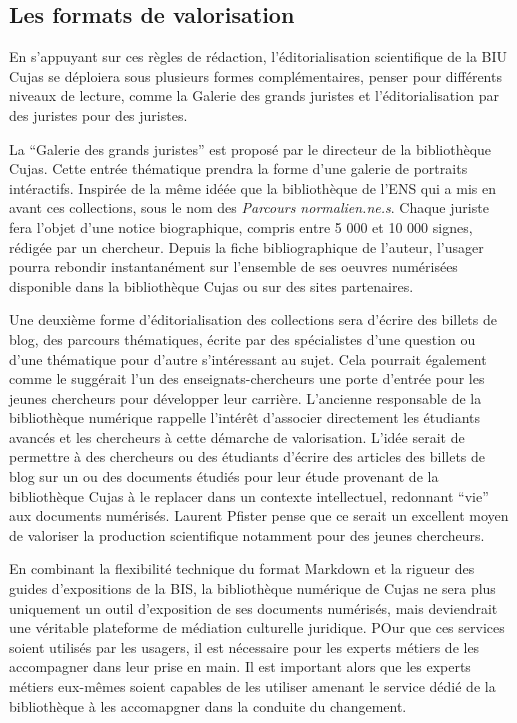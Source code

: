 \subsection{Les formats de valorisation}
En s'appuyant sur ces règles de rédaction, l'éditorialisation scientifique de la BIU Cujas se déploiera sous plusieurs formes complémentaires, penser pour différents niveaux de lecture, comme la Galerie des grands juristes et l'éditorialisation par des juristes pour des juristes.

La \enquote{Galerie des grands juristes} est proposé par le directeur de la bibliothèque Cujas. Cette entrée thématique prendra la forme d'une galerie de portraits intéractifs. Inspirée de la même idéée que la bibliothèque de l'ENS qui a mis en avant ces collections, sous le nom des \textit{Parcours normalien.ne.s}. Chaque juriste fera l'objet d'une notice biographique, compris entre 5 000 et 10 000 signes, rédigée par un chercheur. Depuis la fiche bibliographique de l'auteur, l'usager pourra rebondir instantanément sur l'ensemble de ses oeuvres numérisées disponible dans la bibliothèque Cujas ou sur des sites partenaires.

Une deuxième forme d'éditorialisation des collections sera d'écrire des billets de blog, des parcours thématiques, écrite par des spécialistes d'une question ou d'une thématique pour d'autre s'intéressant au sujet. Cela pourrait également comme le suggérait l'un des enseignats-chercheurs une porte d'entrée pour les jeunes chercheurs pour développer leur carrière. L'ancienne responsable de la bibliothèque numérique rappelle l'intérêt d'associer directement les étudiants avancés et les chercheurs à cette démarche de valorisation. L'idée serait de permettre à des chercheurs ou des étudiants d'écrire des articles des billets de blog sur un ou des documents étudiés pour leur étude provenant de la bibliothèque Cujas à le replacer dans un contexte intellectuel, redonnant \enquote{vie} aux documents numérisés. Laurent Pfister pense que ce serait un excellent moyen de valoriser la production scientifique notamment pour des jeunes chercheurs.

En combinant la flexibilité technique du format Markdown et la rigueur des guides d'expositions de la BIS, la bibliothèque numérique de Cujas ne sera plus uniquement un outil d'exposition de ses documents numérisés, mais deviendrait une véritable plateforme de médiation culturelle juridique. POur que ces services soient utilisés par les usagers, il est nécessaire pour les experts métiers de les accompagner dans leur prise en main. Il est important alors que les experts métiers eux-mêmes soient capables de les utiliser amenant le service dédié de la bibliothèque à les accomapgner dans la conduite du changement.